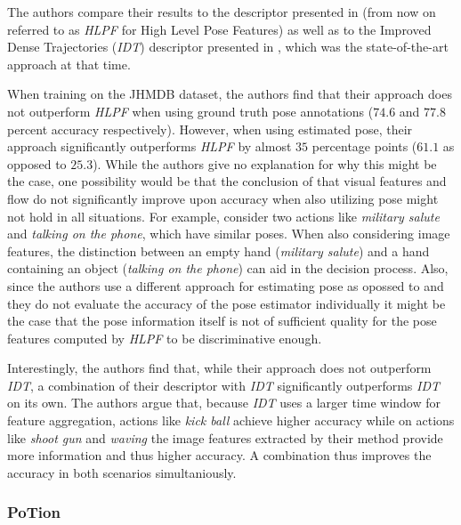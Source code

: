 The authors compare their results to the descriptor presented in  (from now on referred to as \textit{HLPF} for High Level Pose Features) as well as to the Improved Dense Trajectories (\textit{IDT}) descriptor presented in , which was the state-of-the-art approach at that time.

When training on the JHMDB dataset, the authors find that their approach does not outperform \textit{HLPF} when using ground truth pose annotations ($74.6$ and $77.8$ percent accuracy respectively).
However, when using estimated pose, their approach significantly outperforms \textit{HLPF} by almost $35$ percentage points ($61.1$ as opposed to $25.3$).
While the authors give no explanation for why this might be the case, one possibility would be that the conclusion of \cite{jhuang_towards_2013} that visual features and flow do not significantly improve upon accuracy when also utilizing pose might not hold in all situations.
For example, consider two actions like \textit{military salute} and \textit{talking on the phone}, which have similar poses.
When also considering image features, the distinction between an empty hand (\textit{military salute}) and a hand containing an object (\textit{talking on the phone}) can aid in the decision process.
Also, since the authors use a different approach for estimating pose as opossed to \cite{jhuang_towards_2013} and they do not evaluate the accuracy of the pose estimator individually it might be the case that the pose information itself is not of sufficient quality for the pose features computed by \textit{HLPF} to be discriminative enough.

Interestingly, the authors find that, while their approach does not outperform \textit{IDT}, a combination of their descriptor with \textit{IDT} significantly outperforms \textit{IDT} on its own.
The authors argue that, because \textit{IDT} uses a larger time window for feature aggregation, actions like \textit{kick ball} achieve higher accuracy while on actions like \textit{shoot gun} and \textit{waving} the image features extracted by their method provide more information and thus higher accuracy.
A combination thus improves the accuracy in both scenarios simultaniously.

\subsubsection{PoTion}
\label{sec:potion}

